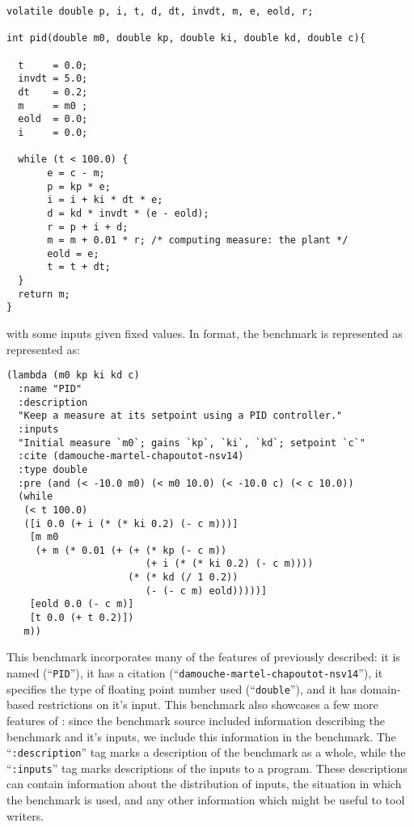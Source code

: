 \documentclass[main.tex]{subfiles}
\begin{document}
\begin{verbatim}
volatile double p, i, t, d, dt, invdt, m, e, eold, r; 

int pid(double m0, double kp, double ki, double kd, double c){

  t     = 0.0;
  invdt = 5.0;
  dt    = 0.2;
  m     = m0 ;
  eold  = 0.0;
  i     = 0.0;
  
  while (t < 100.0) {
       e = c - m;
       p = kp * e;
       i = i + ki * dt * e;
       d = kd * invdt * (e - eold);
       r = p + i + d;
       m = m + 0.01 * r; /* computing measure: the plant */
       eold = e;
       t = t + dt;
  }
  return m;
}
\end{verbatim}

with some inputs given fixed values. In \core format, the benchmark
is represented as represented as:

\begin{verbatim}
(lambda (m0 kp ki kd c)
  :name "PID"
  :description 
  "Keep a measure at its setpoint using a PID controller."
  :inputs 
  "Initial measure `m0`; gains `kp`, `ki`, `kd`; setpoint `c`"
  :cite (damouche-martel-chapoutot-nsv14)
  :type double
  :pre (and (< -10.0 m0) (< m0 10.0) (< -10.0 c) (< c 10.0))
  (while
   (< t 100.0)
   ([i 0.0 (+ i (* (* ki 0.2) (- c m)))]
    [m m0
     (+ m (* 0.01 (+ (+ (* kp (- c m))
                        (+ i (* (* ki 0.2) (- c m))))
                     (* (* kd (/ 1 0.2))
                        (- (- c m) eold)))))]
    [eold 0.0 (- c m)]
    [t 0.0 (+ t 0.2)])
   m))
\end{verbatim}

This benchmark incorporates many of the features of \core previously
described: it is named (``\verb|PID|''), it has a citation
(``\verb|damouche-martel-chapoutot-nsv14|''), it specifies the type of
floating point number used (``\verb|double|''), and it has
domain-based restrictions on it's input. This benchmark also showcases
a few more features of \core: since the benchmark source included
information describing the benchmark and it's inputs, we include this
information in the \name benchmark. The ``\verb|:description|'' tag
marks a description of the benchmark as a whole, while the
``\verb|:inputs|'' tag marks descriptions of the inputs to a
program. These descriptions can contain information about the
distribution of inputs, the situation in which the benchmark is used,
and any other information which might be useful to tool writers.
\end{document}

